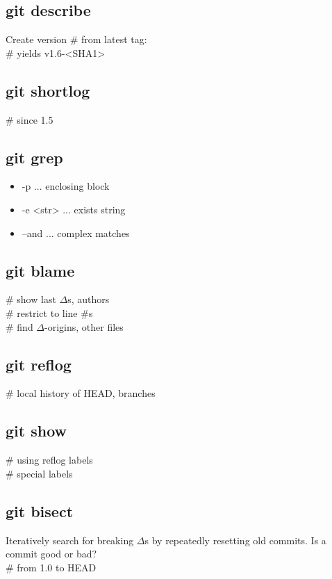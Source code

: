 \subsection*{git describe}
Create version \# from latest tag:\\
 \# yields v1.6-<SHA1>\\

\subsection*{git shortlog}
 \# since 1.5\\

\subsection*{git grep}
\begin{itemize}
    \item -p ... enclosing block
    \item -e <str> ... exists string
    \item --and ... complex matches
\end{itemize}

\subsection*{git blame}
 \# show last $\Delta$s, authors\\
 \# restrict to line \#s\\
 \# find $\Delta$-origins, other files\\


\subsection*{git reflog}
 \# local history of HEAD, branches \\


\subsection*{git show}
 \# using reflog labels \\
 \# special labels \\


\subsection*{git bisect}
Iteratively search for breaking $\Delta$s by repeatedly resetting old commits. Is a commit good or bad?\\
 \# from 1.0 to HEAD\\


